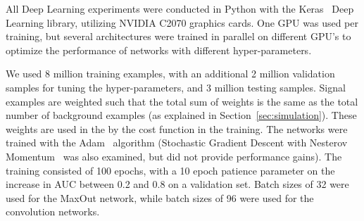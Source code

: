 All Deep Learning experiments were conducted in Python with the Keras~\cite{Keras} Deep Learning library, utilizing NVIDIA C2070 graphics cards. One GPU was used per training, but several architectures were trained in parallel on different GPU's to optimize the performance of networks with different hyper-parameters.

We used 8 million training examples, with an additional 2 million validation samples for tuning the hyper-parameters, and 3 million testing samples.  Signal examples are weighted such that the total sum of weights is the same as the total number of background examples (as explained in Section~\ref{sec:simulation}).  These weights are used in the by the cost function in the training.  The networks were trained with the Adam~\cite{DBLP:journals/corr/KingmaB14} algorithm (Stochastic Gradient Descent with Nesterov Momentum~\cite{Nesterov:1983wy} was also examined, but did not provide performance gains).  The training consisted of 100 epochs, with a 10 epoch patience parameter on the increase in AUC between 0.2 and 0.8 on a validation set.  Batch sizes of 32 were used for the MaxOut network, while batch sizes of 96 were used for the convolution networks.


